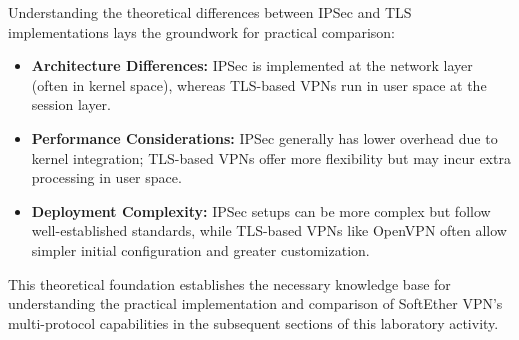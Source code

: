 Understanding the theoretical differences between IPSec and TLS implementations lays the groundwork for practical comparison:

\begin{itemize}
    \item \textbf{Architecture Differences:} IPSec is implemented at the network layer (often in kernel space), whereas TLS-based VPNs run in user space at the session layer.
    
    \item \textbf{Performance Considerations:} IPSec generally has lower overhead due to kernel integration; TLS-based VPNs offer more flexibility but may incur extra processing in user space.
    
    \item \textbf{Deployment Complexity:} IPSec setups can be more complex but follow well-established standards, while TLS-based VPNs like OpenVPN often allow simpler initial configuration and greater customization.
    
\end{itemize}


This theoretical foundation establishes the necessary knowledge base for understanding the practical implementation and comparison of SoftEther VPN's multi-protocol capabilities in the subsequent sections of this laboratory activity.
